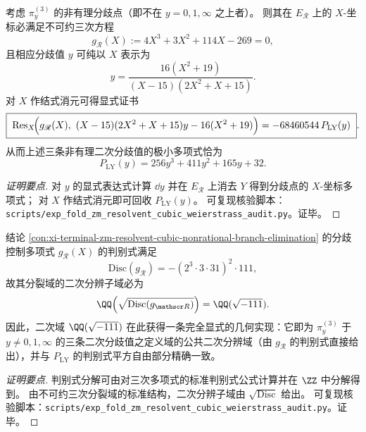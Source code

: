 \begin{conclusion}\label{con:xi-terminal-zm-resolvent-cubic-nonrational-branch-elimination}
考虑 \(\pi^{(3)}_y\) 的非有理分歧点（即不在 \(y=0,1,\infty\) 之上者）。
则其在 \(E_{\mathscr R}\) 上的 \(X\)-坐标必满足不可约三次方程
\[
g_{\mathscr R}(X):=4X^3+3X^2+114X-269=0,
\]
且相应分歧值 \(y\) 可纯以 \(X\) 表示为
\[
y=\frac{16(X^2+19)}{(X-15)(2X^2+X+15)}.
\]
对 \(X\) 作结式消元可得显式证书
\[
\boxed{\;
\mathrm{Res}_X\!\Bigl(g_{\mathscr R}(X),\ (X-15)(2X^2+X+15)y-16(X^2+19)\Bigr)
=-68460544\,P_{\mathrm{LY}}(y)\; }.
\]
从而上述三条非有理二次分歧值的极小多项式恰为
\[
P_{\mathrm{LY}}(y)=256y^3+411y^2+165y+32.
\]
\end{conclusion}
\begin{proof}[证明要点]
对 \(y\) 的显式表达式计算 \(\dd y\) 并在 \(E_{\mathscr R}\) 上消去 \(Y\) 得到分歧点的 \(X\)-坐标多项式；
对 \(X\) 作结式消元即可回收 \(P_{\mathrm{LY}}(y)\)。
可复现核验脚本：\texttt{scripts/exp\_fold\_zm\_resolvent\_cubic\_weierstrass\_audit.py}。证毕。
\end{proof}

\begin{conclusion}\label{con:xi-terminal-zm-resolvent-cubic-sqrt-111-geometric}
结论 \ref{con:xi-terminal-zm-resolvent-cubic-nonrational-branch-elimination} 的分歧控制多项式 \(g_{\mathscr R}(X)\) 的判别式满足
\[
\mathrm{Disc}(g_{\mathscr R})=-(2^3\cdot 3\cdot 31)^2\cdot 111,
\]
故其分裂域的二次分辨子域必为
\[
\QQ\!\left(\sqrt{\mathrm{Disc}(g_{\mathscr R})}\right)=\QQ(\sqrt{-111}).
\]
因此，二次域 \(\QQ(\sqrt{-111})\) 在此获得一条完全显式的几何实现：它即为 \(\pi^{(3)}_y\) 于 \(y\neq 0,1,\infty\) 的三条二次分歧值之定义域的公共二次分辨域（由 \(g_{\mathscr R}\) 的判别式直接给出），并与 \(P_{\mathrm{LY}}\) 的判别式平方自由部分精确一致。
\end{conclusion}
\begin{proof}[证明要点]
判别式分解可由对三次多项式的标准判别式公式计算并在 \(\ZZ\) 中分解得到。
由不可约三次分裂域的标准结构，二次分辨子域由 \(\sqrt{\mathrm{Disc}}\) 给出。
可复现核验脚本：\texttt{scripts/exp\_fold\_zm\_resolvent\_cubic\_weierstrass\_audit.py}。证毕。
\end{proof}

